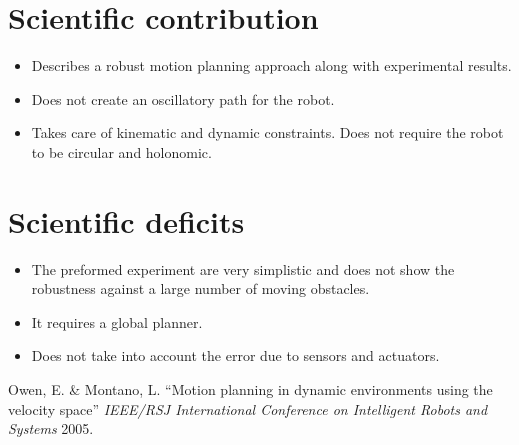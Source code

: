 \documentclass[12pt]{article}
\begin{document}
\section{Scientific contribution}
\begin{itemize}
    \item Describes a robust motion planning approach along with experimental results.
    \item Does not create an oscillatory path for the robot.
    \item Takes care of kinematic and dynamic constraints. Does not require the robot to be circular and holonomic.
\end{itemize}

\section{Scientific deficits}
\begin{itemize}
    \item The preformed experiment are very simplistic and does not show the robustness against a large number of moving obstacles.
    \item It requires a global planner.
    \item Does not take into account the error due to sensors and actuators.
\end{itemize}

\begin{thebibliography}{1}
     Owen, E. \& Montano, L. ``Motion planning in dynamic environments using the velocity space'' \textit{IEEE/RSJ International Conference on Intelligent Robots and Systems} 2005.
\end{thebibliography}
\end{document}

